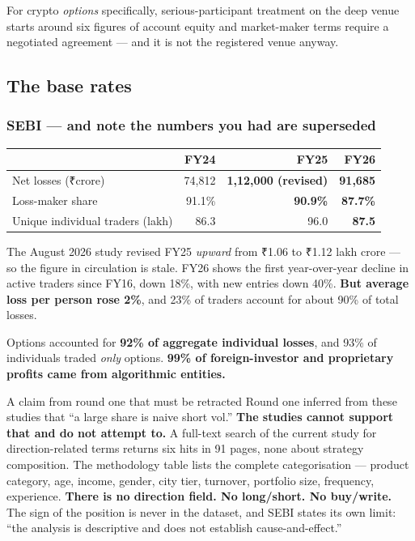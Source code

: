 \documentclass[11pt,a4paper]{article}
\newcommand{\rs}{₹}
\begin{document}
For crypto \emph{options} specifically, serious-participant treatment on the deep
venue starts around six figures of account equity and market-maker terms require a
negotiated agreement --- and it is not the registered venue anyway.

\subsection{The base rates}

\subsubsection{SEBI --- and note the numbers you had are superseded}

\begin{center}
\begin{tabular}{@{}lrrr@{}}
\toprule
& FY24 & FY25 & FY26 \\
\midrule
Net losses (\rs crore) & 74{,}812 & \textbf{1{,}12{,}000 (revised)} & \textbf{91{,}685} \\
Loss-maker share & 91.1\% & \textbf{90.9\%} & \textbf{87.7\%} \\
Unique individual traders (lakh) & 86.3 & 96.0 & \textbf{87.5} \\
\bottomrule
\end{tabular}
\end{center}

The August 2026 study revised FY25 \emph{upward} from \rs 1.06 to \rs 1.12 lakh
crore --- so the figure in circulation is stale. FY26 shows the first
year-over-year decline in active traders since FY16, down 18\%, with new entries
down 40\%. \textbf{But average loss per person rose 2\%}, and 23\% of traders
account for about 90\% of total losses.

Options accounted for \textbf{92\% of aggregate individual losses}, and 93\% of
individuals traded \emph{only} options. \textbf{99\% of foreign-investor and
proprietary profits came from algorithmic entities.}

\begin{keyfact}{A claim from round one that must be retracted}
Round one inferred from these studies that ``a large share is naive short vol.''
\textbf{The studies cannot support that and do not attempt to.} A full-text search
of the current study for direction-related terms returns six hits in 91 pages, none
about strategy composition. The methodology table lists the complete categorisation
--- product category, age, income, gender, city tier, turnover, portfolio size,
frequency, experience. \textbf{There is no direction field. No long/short. No
buy/write.} The sign of the position is never in the dataset, and SEBI states its
own limit: ``the analysis is descriptive and does not establish cause-and-effect.''
\end{keyfact}
\end{document}
